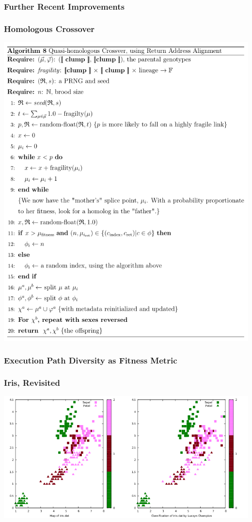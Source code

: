 \documentclass[11pt]{article}
\begin{document}
\subsubsection*{Further Recent Improvements}
\label{sec:orgb1565c3}

\subsubsection*{Homologous Crossover}
\label{sec:orged5c1ba}
\begin{center}
\includegraphics[width=.9\linewidth]{../images/homologous-crossover.png}
\end{center}

\subsubsection*{Execution Path Diversity as Fitness Metric}
\label{sec:org3a5e1a4}

\subsubsection*{Iris, Revisited}
\label{sec:org38a07a3}
\begin{center}
\includegraphics[width=.9\linewidth]{../images/plots/iris_with_luxxyn.png}
\end{center}
\end{document}
